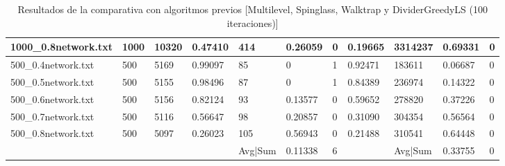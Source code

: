 \begin{sidewaystable}
\begin{tabular}{lllllllllll}
	\multicolumn{1}{|l|}{1000\_0.8network.txt} & \multicolumn{1}{l|}{1000} & \multicolumn{1}{l|}{10320} & \multicolumn{1}{l|}{0.47410} & \multicolumn{1}{l|}{414}   & \multicolumn{1}{l|}{0.26059} & \multicolumn{1}{l|}{0}       & \multicolumn{1}{l|}{0.19665} & \multicolumn{1}{l|}{3314237} & \multicolumn{1}{l|}{0.69331} & \multicolumn{1}{l|}{0}       \\ \hline
	\multicolumn{1}{|l|}{500\_0.4network.txt}  & \multicolumn{1}{l|}{500}  & \multicolumn{1}{l|}{5169}  & \multicolumn{1}{l|}{0.99097} & \multicolumn{1}{l|}{85}    & \multicolumn{1}{l|}{0}       & \multicolumn{1}{l|}{1}       & \multicolumn{1}{l|}{0.92471} & \multicolumn{1}{l|}{183611}  & \multicolumn{1}{l|}{0.06687} & \multicolumn{1}{l|}{0}       \\ \hline
	\multicolumn{1}{|l|}{500\_0.5network.txt}  & \multicolumn{1}{l|}{500}  & \multicolumn{1}{l|}{5155}  & \multicolumn{1}{l|}{0.98496} & \multicolumn{1}{l|}{87}    & \multicolumn{1}{l|}{0}       & \multicolumn{1}{l|}{1}       & \multicolumn{1}{l|}{0.84389} & \multicolumn{1}{l|}{236974}  & \multicolumn{1}{l|}{0.14322} & \multicolumn{1}{l|}{0}       \\ \hline
	\multicolumn{1}{|l|}{500\_0.6network.txt}  & \multicolumn{1}{l|}{500}  & \multicolumn{1}{l|}{5156}  & \multicolumn{1}{l|}{0.82124} & \multicolumn{1}{l|}{93}    & \multicolumn{1}{l|}{0.13577} & \multicolumn{1}{l|}{0}       & \multicolumn{1}{l|}{0.59652} & \multicolumn{1}{l|}{278820}  & \multicolumn{1}{l|}{0.37226} & \multicolumn{1}{l|}{0}       \\ \hline
	\multicolumn{1}{|l|}{500\_0.7network.txt}  & \multicolumn{1}{l|}{500}  & \multicolumn{1}{l|}{5116}  & \multicolumn{1}{l|}{0.56647} & \multicolumn{1}{l|}{98}    & \multicolumn{1}{l|}{0.20857} & \multicolumn{1}{l|}{0}       & \multicolumn{1}{l|}{0.31090} & \multicolumn{1}{l|}{304354}  & \multicolumn{1}{l|}{0.56564} & \multicolumn{1}{l|}{0}       \\ \hline
	\multicolumn{1}{|l|}{500\_0.8network.txt}  & \multicolumn{1}{l|}{500}  & \multicolumn{1}{l|}{5097}  & \multicolumn{1}{l|}{0.26023} & \multicolumn{1}{l|}{105}   & \multicolumn{1}{l|}{0.56943} & \multicolumn{1}{l|}{0}       & \multicolumn{1}{l|}{0.21488} & \multicolumn{1}{l|}{310541}  & \multicolumn{1}{l|}{0.64448} & \multicolumn{1}{l|}{0}       \\ \hline
	&                           &                            &                              & Avg|Sum                    & 0.11338                      & 6                            &                              & Avg|Sum                      & 0.33755                      & 0                           
\end{tabular}
	\caption{Resultados de la comparativa con algoritmos previos [Multilevel, Spinglass, Walktrap y DividerGreedyLS (100 iteraciones)]}
\end{sidewaystable}